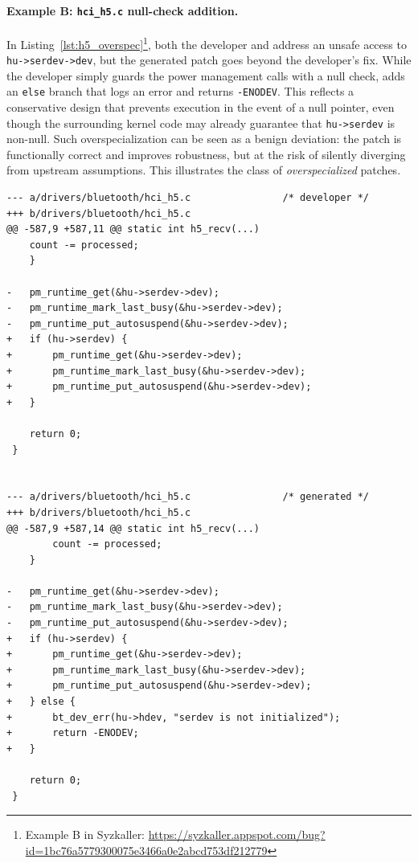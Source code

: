 \paragraph{Example B: \texttt{hci\_h5.c} null-check addition.}
In Listing~\ref{lst:h5_overspec}\footnote{Example B in Syzkaller: \url{https://syzkaller.appspot.com/bug?id=1bc76a5779300075e3466a0e2abcd753df212779}}, both the developer and \cresearcher{} address an unsafe access to \texttt{hu->serdev->dev}, but the generated patch goes beyond the developer's fix. While the developer simply guards the power management calls with a null check, \cresearcher{} adds an \texttt{else} branch that logs an error and returns \texttt{-ENODEV}. This reflects a conservative design that prevents execution in the event of a null pointer, even though the surrounding kernel code may already guarantee that \texttt{hu->serdev} is non-null. Such overspecialization can be seen as a benign deviation: the patch is functionally correct and improves robustness, but at the risk of silently diverging from upstream assumptions. This illustrates the class of \emph{overspecialized} patches.

\begin{code}
\label{lst:h5_overspec}
\begin{verbatim}
--- a/drivers/bluetooth/hci_h5.c                /* developer */
+++ b/drivers/bluetooth/hci_h5.c
@@ -587,9 +587,11 @@ static int h5_recv(...)
    count -= processed;
    }

-   pm_runtime_get(&hu->serdev->dev);
-   pm_runtime_mark_last_busy(&hu->serdev->dev);
-   pm_runtime_put_autosuspend(&hu->serdev->dev);
+   if (hu->serdev) {
+       pm_runtime_get(&hu->serdev->dev);
+       pm_runtime_mark_last_busy(&hu->serdev->dev);
+       pm_runtime_put_autosuspend(&hu->serdev->dev);
+   }

    return 0;
 }


--- a/drivers/bluetooth/hci_h5.c                /* generated */
+++ b/drivers/bluetooth/hci_h5.c
@@ -587,9 +587,14 @@ static int h5_recv(...)
 		count -= processed;
 	}
    
-   pm_runtime_get(&hu->serdev->dev);
-   pm_runtime_mark_last_busy(&hu->serdev->dev);
-   pm_runtime_put_autosuspend(&hu->serdev->dev);
+   if (hu->serdev) {
+       pm_runtime_get(&hu->serdev->dev);
+       pm_runtime_mark_last_busy(&hu->serdev->dev);
+       pm_runtime_put_autosuspend(&hu->serdev->dev);
+   } else {
+       bt_dev_err(hu->hdev, "serdev is not initialized");
+       return -ENODEV;
+   }

    return 0;
 }
\end{verbatim}
\end{code}

